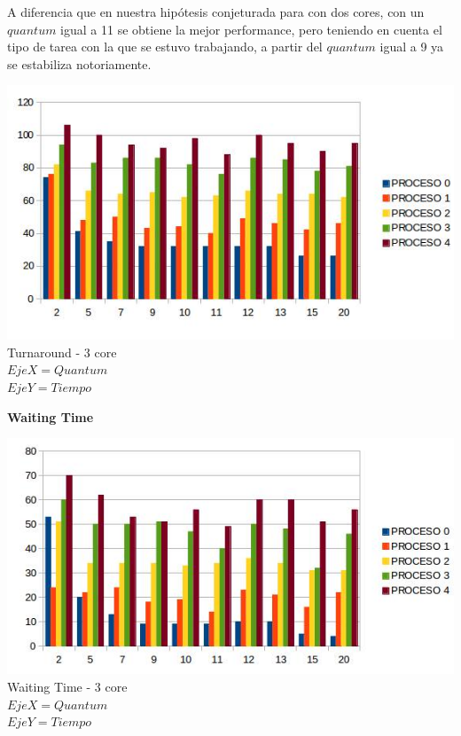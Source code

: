  \indent A diferencia que en nuestra hipótesis conjeturada para con dos cores, 
 con un $quantum$ igual a 11 se obtiene la mejor  performance, 
 pero teniendo en cuenta el tipo de tarea con la 
 que se estuvo trabajando, a partir del $quantum$ igual a 9 ya se estabiliza notoriamente.\\
   
    \begin{center}
    	\includegraphics[width=1\textwidth]{./EJ7/tour3core.png}
	{Turnaround - 3 core}\\
	{$Eje X = Quantum $\\$ Eje Y = Tiempo$}\\
 \end{center} 
  
   \begin{center}
  \textbf{Waiting Time}
 \end{center}

  \begin{center}
    	\includegraphics[width=1\textwidth]{./EJ7/waintin3core.jpg}
	{Waiting Time - 3 core}	\\
	{$Eje X = Quantum $\\$Eje Y = Tiempo$}\\
 \end{center} 
 
